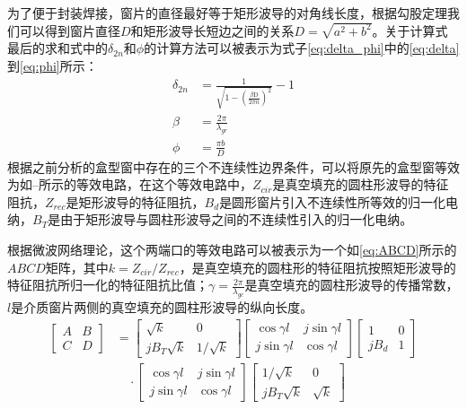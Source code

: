 \documentclass[master]{thesis-uestc}
\begin{document}
为了便于封装焊接，窗片的直径最好等于矩形波导的对角线长度，根据勾股定理我们可以得到窗片直径$D$和矩形波导长短边之间的关系$D=\sqrt{a^2+b^2} $。关于计算式最后的求和式中的$\delta_{2n}$和$\phi$的计算方法可以被表示为式子\ref{eq:delta_phi}中的\ref{eq:delta}到\ref{eq:phi}所示：
\begin{subequations}\label{eq:delta_phi}
\begin{align}
    \delta_{2 n} &= \frac{1}{\sqrt{1-\left(\frac{\beta \mathrm{D}}{2 \pi n}\right)^{2}}}-1 \label{eq:delta}\\
    \beta &= \frac{2 \pi}{\lambda_{gr}} \label{eq:beta}\\
    \phi &= \frac{\pi b}{D} \label{eq:phi}
\end{align}
\end{subequations}
根据之前分析的盒型窗中存在的三个不连续性边界条件，可以将原先的盒型窗等效为如--所示的等效电路，在这个等效电路中，$Z_{cir}$是真空填充的圆柱形波导的特征阻抗，$Z_{rec}$是矩形波导的特征阻抗，$B_{d}$是圆形窗片引入不连续性所等效的归一化电纳，$B_{T}$是由于矩形波导与圆柱形波导之间的不连续性引入的归一化电纳。

根据微波网络理论，这个两端口的等效电路可以被表示为一个如\ref{eq:ABCD}所示的$ABCD$矩阵，其中$k=Z_{cir}/Z_{rec}$，是真空填充的圆柱形的特征阻抗按照矩形波导的特征阻抗所归一化的特征阻抗比值；$\gamma=\frac{2 \pi}{\lambda_{gc}}$是真空填充的圆柱形波导的传播常数，$l$是介质窗片两侧的真空填充的圆柱形波导的纵向长度。
\begin{equation}\label{eq:ABCD}
    \begin{split}
        \begin{bmatrix}
            A & B \\
            C & D
        \end{bmatrix} 
        & = 
        \begin{bmatrix}
            \sqrt{k} & 0 \\
            jB_{T}\sqrt{k} & 1/\sqrt{k}
        \end{bmatrix}
        \begin{bmatrix}
            \cos{\gamma l} & j\sin{\gamma l} \\
            j\sin{\gamma l} & \cos{\gamma l}
        \end{bmatrix}
        \begin{bmatrix}
            1 & 0 \\
            jB_{d} & 1
        \end{bmatrix} \\
        & \quad \cdot 
        \begin{bmatrix}
            \cos{\gamma l} & j\sin{\gamma l} \\
            j\sin{\gamma l} & \cos{\gamma l}
        \end{bmatrix}
        \begin{bmatrix}
            1/\sqrt{k} & 0 \\
            jB_{T}\sqrt{k} & \sqrt{k}
        \end{bmatrix}
    \end{split}
\end{equation}
\end{document}
